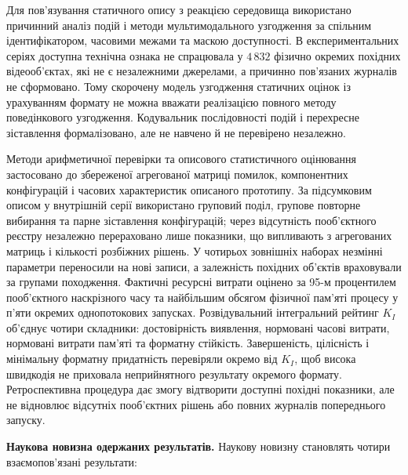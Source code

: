 Для пов’язування статичного опису з реакцією середовища використано причинний аналіз подій і методи мультимодального узгодження за спільним ідентифікатором, часовими межами та маскою доступності. В експериментальних серіях доступна технічна ознака не спрацювала у $4\,832$ фізично окремих похідних відеооб’єктах, які не є незалежними джерелами, а причинно пов’язаних журналів не сформовано. Тому скорочену модель узгодження статичних оцінок із урахуванням формату не можна вважати реалізацією повного методу поведінкового узгодження. Кодувальник послідовності подій і перехресне зіставлення формалізовано, але не навчено й не перевірено незалежно.

Методи арифметичної перевірки та описового статистичного оцінювання застосовано до збереженої агрегованої матриці помилок, компонентних конфігурацій і часових характеристик описаного прототипу. За підсумковим описом у внутрішній серії використано груповий поділ, групове повторне вибирання та парне зіставлення конфігурацій; через відсутність пооб’єктного реєстру незалежно перераховано лише показники, що випливають з агрегованих матриць і кількості розбіжних рішень. У чотирьох зовнішніх наборах незмінні параметри переносили на нові записи, а залежність похідних об’єктів враховували за групами походження. Фактичні ресурсні витрати оцінено за 95-м процентилем пооб’єктного наскрізного часу та найбільшим обсягом фізичної пам’яті процесу у п’яти окремих однопотокових запусках. Розвідувальний інтегральний рейтинг $K_I$ об’єднує чотири складники: достовірність виявлення, нормовані часові витрати, нормовані витрати пам’яті та форматну стійкість. Завершеність, цілісність і мінімальну форматну придатність перевіряли окремо від $K_I$, щоб висока швидкодія не приховала неприйнятного результату окремого формату. Ретроспективна процедура дає змогу відтворити доступні похідні показники, але не відновлює відсутніх пооб’єктних рішень або повних журналів попереднього запуску.

\textbf{Наукова новизна одержаних результатів.}
Наукову новизну становлять чотири взаємопов’язані результати:


